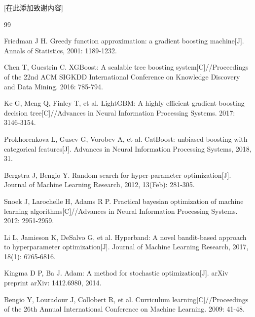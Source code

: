 \documentclass[12pt,a4paper]{article}
\begin{document}
[在此添加致谢内容]

\begin{thebibliography}{99}

Friedman J H.  Greedy function approximation: a gradient boosting machine[J]. Annals of Statistics, 2001: 1189-1232.

Chen T, Guestrin C.  XGBoost: A scalable tree boosting system[C]//Proceedings of the 22nd ACM SIGKDD International Conference on Knowledge Discovery and Data Mining. 2016: 785-794.

Ke G, Meng Q, Finley T, et al. LightGBM: A highly efficient gradient boosting decision tree[C]//Advances in Neural Information Processing Systems. 2017: 3146-3154.

Prokhorenkova L, Gusev G, Vorobev A, et al. CatBoost: unbiased boosting with categorical features[J].  Advances in Neural Information Processing Systems, 2018, 31.

Bergstra J, Bengio Y. Random search for hyper-parameter optimization[J]. Journal of Machine Learning Research, 2012, 13(Feb): 281-305.

Snoek J, Larochelle H, Adams R P.  Practical bayesian optimization of machine learning algorithms[C]//Advances in Neural Information Processing Systems. 2012: 2951-2959.

Li L, Jamieson K, DeSalvo G, et al.  Hyperband: A novel bandit-based approach to hyperparameter optimization[J]. Journal of Machine Learning Research, 2017, 18(1): 6765-6816.

Kingma D P, Ba J.  Adam: A method for stochastic optimization[J]. arXiv preprint arXiv: 1412.6980, 2014.

Bengio Y, Louradour J, Collobert R, et al. Curriculum learning[C]//Proceedings of the 26th Annual International Conference on Machine Learning. 2009: 41-48.

\end{thebibliography}
\end{document}
